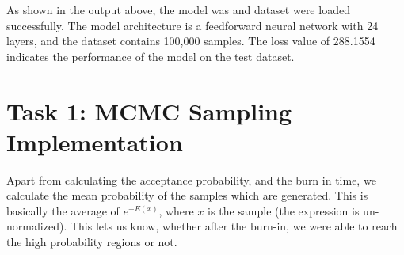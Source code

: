 \documentclass[a4paper,12pt]{article}
\begin{document}
As shown in the output above, the model was and dataset were loaded successfully. The model architecture is a feedforward neural network with 24 layers, and the dataset contains 100,000 samples. The loss value of 288.1554 indicates the performance of the model on the test dataset.

\section*{Task 1: MCMC Sampling Implementation}
Apart from calculating the acceptance probability, and the burn in time, we calculate the mean probability of the samples which are generated. This is basically the average of $e^{-E(x)}$, where $x$ is the sample (the expression is un-normalized). This lets us know, whether after the burn-in, we were able to reach the high probability regions or not.
\end{document}
